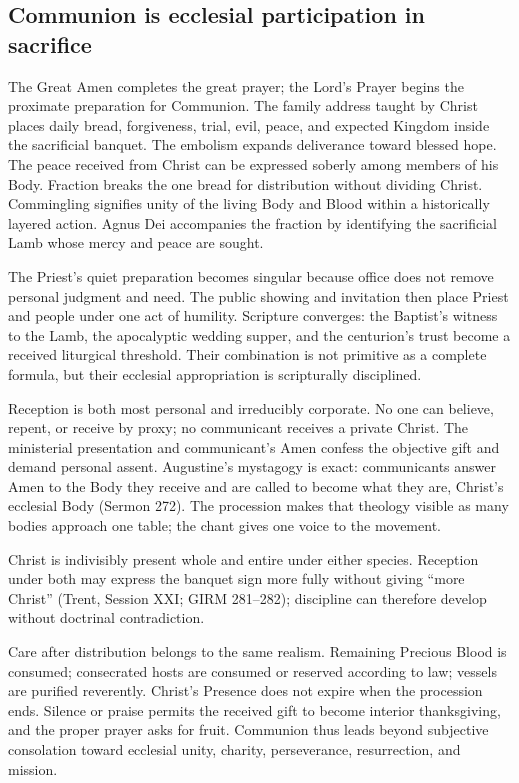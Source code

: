\subsection{Communion is ecclesial participation in sacrifice}

The Great Amen completes the great prayer; the Lord's Prayer begins the proximate preparation for Communion. The family address taught by Christ places daily bread, forgiveness, trial, evil, peace, and expected Kingdom inside the sacrificial banquet. The embolism expands deliverance toward blessed hope. The peace received from Christ can be expressed soberly among members of his Body. Fraction breaks the one bread for distribution without dividing Christ. Commingling signifies unity of the living Body and Blood within a historically layered action. Agnus Dei accompanies the fraction by identifying the sacrificial Lamb whose mercy and peace are sought.

The Priest's quiet preparation becomes singular because office does not remove personal judgment and need. The public showing and invitation then place Priest and people under one act of humility. Scripture converges: the Baptist's witness to the Lamb, the apocalyptic wedding supper, and the centurion's trust become a received liturgical threshold. Their combination is not primitive as a complete formula, but their ecclesial appropriation is scripturally disciplined.

Reception is both most personal and irreducibly corporate. No one can believe, repent, or receive by proxy; no communicant receives a private Christ. The ministerial presentation and communicant's Amen confess the objective gift and demand personal assent. Augustine's mystagogy is exact: communicants answer Amen to the Body they receive and are called to become what they are, Christ's ecclesial Body (Sermon 272). The procession makes that theology visible as many bodies approach one table; the chant gives one voice to the movement.

Christ is indivisibly present whole and entire under either species. Reception under both may express the banquet sign more fully without giving ``more Christ'' (Trent, Session XXI; GIRM 281--282); discipline can therefore develop without doctrinal contradiction.

Care after distribution belongs to the same realism. Remaining Precious Blood is consumed; consecrated hosts are consumed or reserved according to law; vessels are purified reverently. Christ's Presence does not expire when the procession ends. Silence or praise permits the received gift to become interior thanksgiving, and the proper prayer asks for fruit. Communion thus leads beyond subjective consolation toward ecclesial unity, charity, perseverance, resurrection, and mission.

